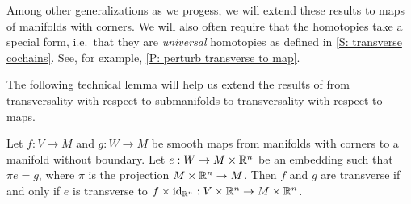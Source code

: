 Among other generalizations as we progess, we will extend these results to maps of manifolds with corners. We will also often require that the homotopies take a special form, i.e.\ that they are {\it universal} homotopies as defined in \cref{S: transverse cochains}. See, for example, \cref{P: perturb transverse to map}. 

The following technical lemma will help us extend the results of \cite{GuPo74} from transversality with respect to submanifolds to transversality with respect to maps.


\begin{lemma}\label{L: all transversality is wrt embeddings}
Let $f:V\to M$ and $g:W\to M$ be smooth maps from manifolds with corners to a manifold without boundary. Let $e:W\to M\times \mathbb{R}^n$ be an embedding such that $\pi e=g$, where $\pi$ is the projection $M\times \mathbb{R}^n\to M$. Then $f$ and $g$ are transverse if and only if $e$ is transverse to $f\times\mathrm{id}_{\mathbb{R}^n}:V\times \mathbb{R}^n\to M\times \mathbb{R}^n$. 
\end{lemma}

